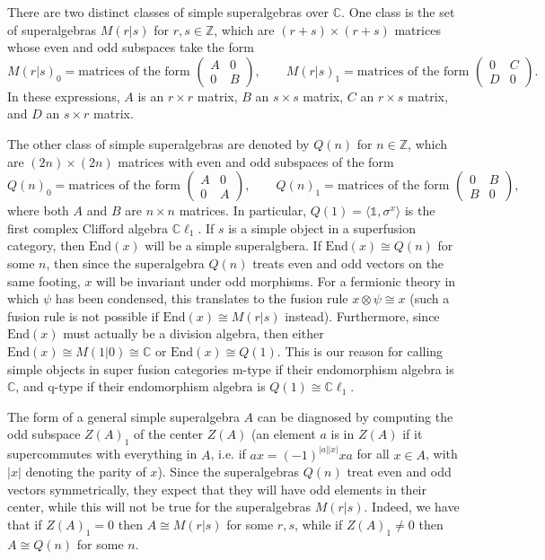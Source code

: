 \documentclass[12pt,a4paper]{article}
\newcommand{\tp}{\otimes}
\newcommand{\unit}{\mathds{1}}
\newcommand{\zz}{\mathbb{Z}}
\newcommand{\cc}{\mathbb{C}}
\newcommand\be            {\begin{equation}}
\newcommand\ee            {\end{equation}}
\newcommand{\End}{\text{End}}
\newcommand{\cl}{\mathbb{C}\ell}
\begin{document}
There are two distinct classes of simple superalgebras over $\cc$. One class is the set of superalgebras $M(r|s)$ for $r,s\in\zz$, which are $(r+s)\times(r+s)$ matrices whose even and odd subspaces take the form
\be M(r|s)_0 = \text{matrices of the form\ } \begin{pmatrix} A & 0 \\ 0 & B \end{pmatrix},\qquad M(r|s)_1 = \text{matrices of the form\ } \begin{pmatrix} 0 & C \\ D & 0 \end{pmatrix}.\ee
In these expressions, $A$ is an $r\times r$ matrix, $B$ an $s\times s$ matrix, $C$ an $r\times s$ matrix, and $D$ an $s\times r$ matrix. 

The other class of simple superalgebras are denoted by $Q(n)$ for $n\in \zz$, which are $(2n)\times(2n)$ matrices with even and odd subspaces of the form
\be Q(n)_0 = \text{matrices of the form\ } \begin{pmatrix} A & 0 \\ 0 & A \end{pmatrix},\qquad Q(n)_1 = \text{matrices of the form\ } \begin{pmatrix} 0 & B \\ B & 0 \end{pmatrix},\ee
where both $A$ and $B$ are $n\times n$ matrices. In particular, $Q(1) = \langle \unit, \sigma^x\rangle$ is the first complex Clifford algebra $\cl_1$. 
If $s$ is a simple object in a superfusion category, then $\End(x)$ will be a simple superalgbera. If $\End(x)\cong Q(n)$ for some $n$, then since the superalgebra $Q(n)$ treats even and odd vectors 
on the same footing, $x$ will be invariant under odd morphisms. 
For a fermionic theory in which $\psi$ has been condensed, this translates to the fusion rule $x\tp\psi \cong x$ (such a fusion rule is not possible if $\End(x)\cong M(r|s)$ instead). 
Furthermore, since $\End(x)$ must actually be a division algebra, then either $\End(x) \cong M(1|0) \cong \cc$ or $\End(x) \cong Q(1)$. 
This is our reason for calling simple objects in super fusion categories m-type if their endomorphism algebra is $\cc$, and q-type if their endomorphism algebra is $Q(1)\cong\cl_1$. 

The form of a general simple superalgebra $A$ can be diagnosed by computing the odd subspace $Z(A)_1$ of the center $Z(A)$ (an element $a$ is in $Z(A)$ if it supercommutes with everything in $A$, i.e. if $ax = (-1)^{|a||x|}xa$ for all $x\in A$, with $|x|$ denoting the parity of $x$).
Since the superalgebras $Q(n)$ treat even and odd vectors symmetrically, they expect that they will have odd elements in their center, while this will not be true for the superalgebras $M(r|s)$. 
Indeed, we have that if $Z(A)_1 = 0$ then $A \cong M(r|s)$ for some $r,s$, while if $Z(A)_1 \neq 0$ then $A\cong Q(n)$ for some $n$. 
\end{document}
